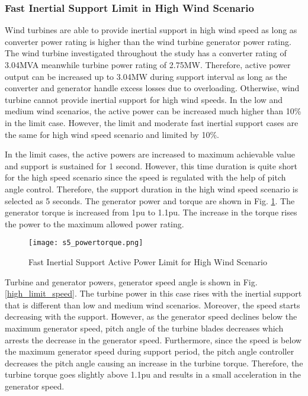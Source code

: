 \subsubsection{Fast Inertial Support Limit in High Wind Scenario}
Wind turbines are able to provide inertial support in high wind speed as long as converter power rating is higher than the wind turbine generator power rating. The wind turbine investigated throughout the study has a converter rating of 3.04MVA meanwhile turbine power rating of 2.75MW. Therefore, active power output can be increased up to 3.04MW during support interval as long as the converter and generator handle excess losses due to overloading. Otherwise, wind turbine cannot provide inertial support for high wind speeds. In the low and medium wind scenarios, the active power can be increased much higher than 10\% in the limit case. However, the limit and moderate fast inertial support cases are the same for high wind speed scenario and limited by 10\%.\par
In the limit cases, the active powers are increased to maximum achievable value and support is sustained for 1 second. However, this time duration is quite short for the high speed scenario since the speed is regulated with the help of pitch angle control. Therefore, the support duration in the high wind speed scenario is selected as 5 seconds. The generator power and torque are shown in Fig. \ref{high_powers}. The generator torque is increased from 1pu to 1.1pu. The increase in the torque rises the power to the maximum allowed power rating. \par
\begin{figure}[h]
	\centering
	\texttt{[image: s5\_powertorque.png]}
	\caption{Fast Inertial Support Active Power Limit for High Wind Scenario}
	\label{high_powers}
\end{figure}
Turbine and generator powers, generator speed angle is shown in Fig. \ref{high_limit_speed}. The turbine power in this case rises with the inertial support that is different than low and medium wind scenarios. Moreover, the speed starts decreasing with the support. However, as the generator speed declines below the maximum generator speed, pitch angle of the turbine blades decreases which arrests the decrease in the generator speed. Furthermore, since the speed is below the maximum generator speed during support period, the pitch angle controller decreases the pitch angle causing an increase in the turbine torque. Therefore, the turbine torque goes slightly above 1.1pu and results in a small acceleration in the generator speed. \par
